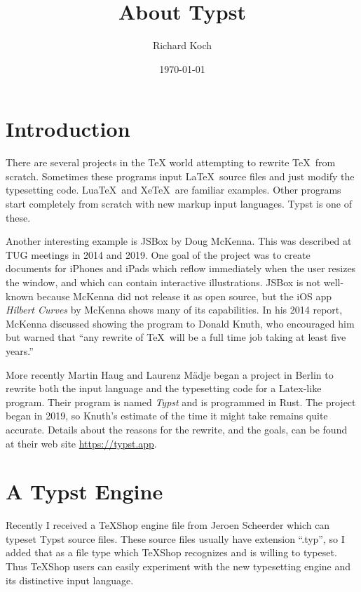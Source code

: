 \documentclass[11pt, oneside]{article}   	%
\title{About Typst}
\author{Richard Koch}
\date{\today}							%
\begin{document}
\maketitle

\section{Introduction} 
There are several projects in the TeX world attempting to rewrite \TeX\ from scratch. Sometimes  these programs input \LaTeX\ source files and just modify the typesetting code. Lua\TeX\ and Xe\TeX\ are familiar examples. Other programs start completely from scratch with new markup input languages. Typst is one of these.

Another interesting example is JSBox by Doug McKenna. This was described at TUG meetings in 2014 and 2019. One goal of the project was to create documents for iPhones and iPads which reflow immediately when the user resizes the window, and which can contain interactive illustrations. JSBox is not well-known because McKenna did not release it as open source, but the iOS app {\em Hilbert Curves} by McKenna shows many of its capabilities. In his 2014 report, McKenna discussed showing the program to Donald Knuth, who encouraged him but warned that ``any rewrite of \TeX\ will be a full time job taking at least five years.''

More recently Martin Haug and Laurenz Mädje began a project in Berlin to rewrite both the input language and the typesetting code for a Latex-like program.  Their program is named {\em Typst} and is programmed in Rust. The project began in 2019, so Knuth's estimate of the time it might take remains quite accurate. Details about the reasons for the rewrite, and the goals, can be found at their web site \url{https://typst.app}. 

\section{A Typst Engine} 
Recently I received a TeXShop engine file from Jeroen Scheerder which can typeset Typst
source files. These source files usually have extension ``.typ'', so I added that as a file type which TeXShop
recognizes and is willing to typeset. Thus TeXShop users can easily experiment with the new typesetting
engine and its distinctive input language.
\end{document}
